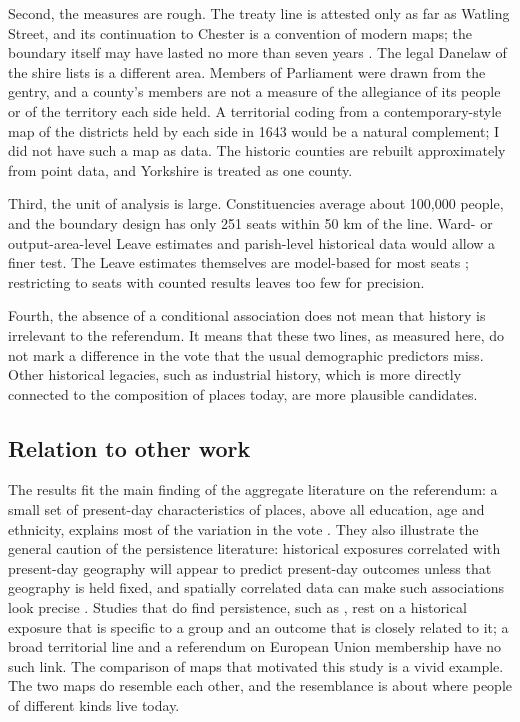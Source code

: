 \documentclass[11pt,a4paper]{article}
\begin{document}
Second, the measures are rough. The treaty line is attested only as far as Watling Street, and its continuation to Chester is a convention of modern maps; the boundary itself may have lasted no more than seven years \citep{rochester2023}. The legal Danelaw of the shire lists is a different area. Members of Parliament were drawn from the gentry, and a county's members are not a measure of the allegiance of its people or of the territory each side held. A territorial coding from a contemporary-style map of the districts held by each side in 1643 \citep{gardiner1914} would be a natural complement; I did not have such a map as data. The historic counties are rebuilt approximately from point data, and Yorkshire is treated as one county.

Third, the unit of analysis is large. Constituencies average about 100,000 people, and the boundary design has only 251 seats within 50 km of the line. Ward- or output-area-level Leave estimates and parish-level historical data would allow a finer test. The Leave estimates themselves are model-based for most seats \citep{hanretty2017}; restricting to seats with counted results leaves too few for precision.

Fourth, the absence of a conditional association does not mean that history is irrelevant to the referendum. It means that these two lines, as measured here, do not mark a difference in the vote that the usual demographic predictors miss. Other historical legacies, such as industrial history, which is more directly connected to the composition of places today, are more plausible candidates.

\subsection{Relation to other work}
The results fit the main finding of the aggregate literature on the referendum: a small set of present-day characteristics of places, above all education, age and ethnicity, explains most of the variation in the vote \citep{becker2017,goodwin2016,alabrese2019}. They also illustrate the general caution of the persistence literature: historical exposures correlated with present-day geography will appear to predict present-day outcomes unless that geography is held fixed, and spatially correlated data can make such associations look precise \citep{conley1999}. Studies that do find persistence, such as \citet{voigtlaender2012}, rest on a historical exposure that is specific to a group and an outcome that is closely related to it; a broad territorial line and a referendum on European Union membership have no such link. The comparison of maps that motivated this study is a vivid example. The two maps do resemble each other, and the resemblance is about where people of different kinds live today.
\end{document}
